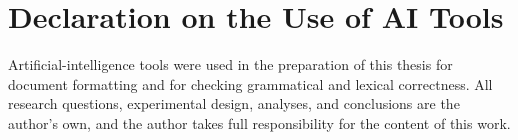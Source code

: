 \documentclass[en,11pt]{aghdpl}  %
\begin{document}
\chapter*{Declaration on the Use of AI Tools}

Artificial-intelligence tools were used in the preparation of this thesis
for document formatting and for checking grammatical and lexical
correctness. All research questions, experimental design, analyses, and
conclusions are the author's own, and the author takes full responsibility
for the content of this work.

\newpage
{
	\fancyhf{}
	\renewcommand{\headrulewidth}{0pt}
	\renewcommand{\footrulewidth}{0pt}
}

\setcounter{tocdepth}{2}
\tableofcontents
\clearpage
\thispagestyle{empty}
\listoffigures
\newpage
\thispagestyle{empty}
\listoftables
\newpage











% 
% 

\printbibliography
\end{document}
